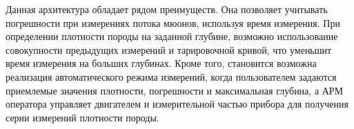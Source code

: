Данная архитектура обладает рядом преимуществ. Она позволяет учитывать погрешности при измерениях потока мюонов, используя время измерения. 
При определении плотности породы на заданной глубине, возможно использование совокупности предыдущих измерений и тарировочной кривой, что уменьшит время измерения на больших глубинах.
Кроме того, становится возможна реализация автоматического режима измерений, когда пользователем задаются приемлемые значения плотности, погрешности и максимальная глубина, а АРМ оператора управляет двигателем и измерительной частью прибора для получения серии измерений плотности породы. 

% 



\clearpage
